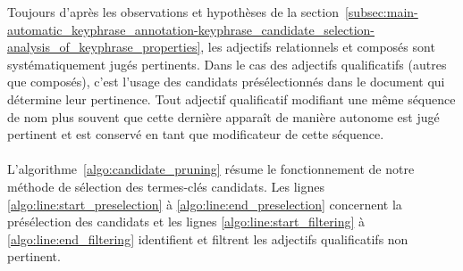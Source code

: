         Toujours d'après les observations et hypothèses de la
        section~\ref{subsec:main-automatic_keyphrase_annotation-keyphrase_candidate_selection-analysis_of_keyphrase_properties},
        les adjectifs relationnels et composés sont systématiquement jugés
        pertinents. Dans le cas des adjectifs qualificatifs (autres que
        composés), c'est l'usage des candidats présélectionnés dans le document
        qui détermine leur pertinence. Tout adjectif qualificatif modifiant une
        même séquence de nom plus souvent que cette dernière apparaît de manière
        autonome est jugé pertinent et est conservé en tant que modificateur de
        cette séquence.

        \paragraph{}
        L'algorithme~\ref{algo:candidate_pruning} résume le
        fonctionnement de notre méthode de sélection des termes-clés candidats.
        Les lignes \ref{algo:line:start_preselection} à
        \ref{algo:line:end_preselection} concernent la présélection des
        candidats et les lignes \ref{algo:line:start_filtering} à
        \ref{algo:line:end_filtering} identifient et filtrent les adjectifs
        qualificatifs non pertinent.
